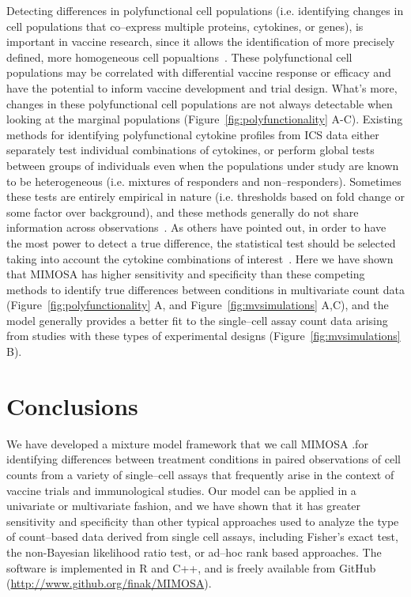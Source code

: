 \documentclass[11pt]{article}
\begin{document}
Detecting differences in polyfunctional cell populations (i.e. identifying changes in cell populations that co--express multiple proteins, cytokines, or genes), is important in vaccine research, since it allows the identification of more precisely defined, more homogeneous cell popualtions~\cite{Milush:2009bz}. These polyfunctional cell populations may be correlated with differential vaccine response or efficacy and have the potential to inform vaccine development and trial design. What's more, changes in these polyfunctional cell populations are not always detectable when looking at the marginal populations (Figure~\ref{fig:polyfunctionality} A-C). Existing methods for identifying polyfunctional cytokine profiles from ICS data either separately test individual combinations of cytokines, or perform global tests between groups of individuals even when the populations under study are known to be heterogeneous (i.e. mixtures of responders and non--responders).  Sometimes these tests are entirely empirical in nature (i.e. thresholds based on fold change or some factor over background), and these methods generally do not share information across observations~\cite{Dittrich:2012bv,Trigona:2003,Sinclair:2004hs,Horton:2007tsa,Proschan:2009ks,Nason:2006dx}. As others have pointed out, in order to have the most power to detect a true difference, the statistical test should be selected taking into account the cytokine combinations of interest~\cite{Nason:2006dx}. Here we have shown that MIMOSA has higher sensitivity and specificity than these competing methods to identify true differences between conditions in multivariate count data (Figure~\ref{fig:polyfunctionality} A, and Figure~\ref{fig:mvsimulations} A,C), and the model generally provides a better fit to the single--cell assay count data arising from studies with these types of experimental designs (Figure~\ref{fig:mvsimulations} B).

\section{Conclusions}
We have developed a mixture model framework that we call MIMOSA .for identifying differences between treatment conditions in paired observations of cell counts from a variety of single--cell assays that frequently arise in the context of vaccine trials and immunological studies. Our model can be applied in a univariate or multivariate fashion, and we have shown that it has greater sensitivity and specificity than other typical approaches used to analyze the type of count--based data derived from single cell assays, including Fisher's exact test, the non-Bayesian likelihood ratio test, or ad--hoc rank based approaches. The software is implemented in R and C++, and is freely available from GitHub (\url{http://www.github.org/finak/MIMOSA}). 
\end{document}
